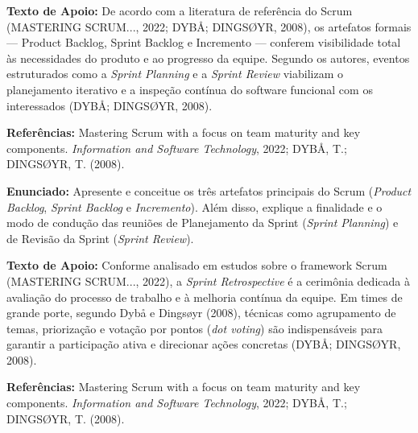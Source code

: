 \documentclass[12pt]{article}
\begin{document}
\vspace{0.15cm}

\begin{textoApoio}
\small
\textbf{Texto de Apoio:} De acordo com a literatura de referência do Scrum (MASTERING SCRUM..., 2022; DYBÅ; DINGSØYR, 2008), os artefatos formais — Product Backlog, Sprint Backlog e Incremento — conferem visibilidade total às necessidades do produto e ao progresso da equipe. Segundo os autores, eventos estruturados como a \textit{Sprint Planning} e a \textit{Sprint Review} viabilizam o planejamento iterativo e a inspeção contínua do software funcional com os interessados (DYBÅ; DINGSØYR, 2008).

\vspace{0.15cm}
\noindent\textbf{Referências:} Mastering Scrum with a focus on team maturity and key components. \textit{Information and Software Technology}, 2022; DYBÅ, T.; DINGSØYR, T. (2008).
\end{textoApoio}

\vspace{0.15cm}
\noindent\textbf{Enunciado:} Apresente e conceitue os três artefatos principais do Scrum (\textit{Product Backlog}, \textit{Sprint Backlog} e \textit{Incremento}). Além disso, explique a finalidade e o modo de condução das reuniões de Planejamento da Sprint (\textit{Sprint Planning}) e de Revisão da Sprint (\textit{Sprint Review}).

\vspace{0.2cm}
\begin{caixaResposta}
\end{caixaResposta}

\vspace{0.6cm}

\vspace{0.15cm}

\begin{textoApoio}
\small
\textbf{Texto de Apoio:} Conforme analisado em estudos sobre o framework Scrum (MASTERING SCRUM..., 2022), a \textit{Sprint Retrospective} é a cerimônia dedicada à avaliação do processo de trabalho e à melhoria contínua da equipe. Em times de grande porte, segundo Dybå e Dingsøyr (2008), técnicas como agrupamento de temas, priorização e votação por pontos (\textit{dot voting}) são indispensáveis para garantir a participação ativa e direcionar ações concretas (DYBÅ; DINGSØYR, 2008).

\vspace{0.15cm}
\noindent\textbf{Referências:} Mastering Scrum with a focus on team maturity and key components. \textit{Information and Software Technology}, 2022; DYBÅ, T.; DINGSØYR, T. (2008).
\end{textoApoio}
\end{document}
